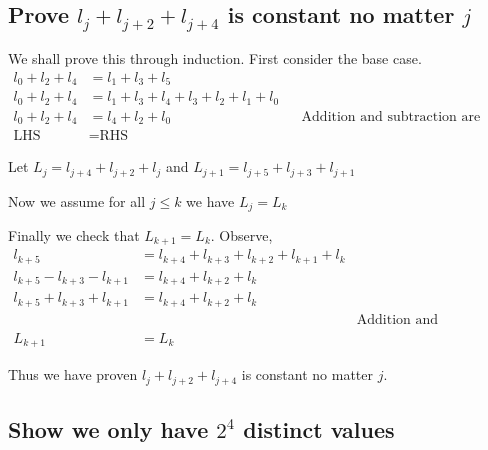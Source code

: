 \documentclass{article}
\begin{document}
\subsection{Prove $l_j+l_{j+2}+l_{j+4}$ is constant no matter $j$}
We shall prove this through induction. First consider the base case.
\begin{align*}
    l_0 + l_2 + l_4 &= l_1 + l_3 + l_5 \\
    l_0 + l_2 + l_4 &= l_1 + l_3 + l_4 + l_3 + l_2 + l_1 + l_0 \\
    l_0 + l_2 + l_4 &= l_4 + l_2 + l_0
    && \text{Addition and subtraction are equal in binary} \\
    \text{LHS} &= \text{RHS}
\end{align*}

Let $L_j = l_{j+4} + l_{j+2} + l_{j}$ and 
$L_{j+1} = l_{j+5} + l_{j+3} + l_{j+1}$

Now we assume for all $j \leq k$ we have $L_j = L_k$

Finally we check that $L_{k+1} = L_k$.
Observe,
\begin{align*}
    l_{k+5} &= l_{k+4} + l_{k+3} + l_{k+2} + l_{k+1} + l_{k} \\
    l_{k+5} - l_{k+3} - l_{k+1} &= l_{k+4} + l_{k+2} + l_{k} \\
    l_{k+5} + l_{k+3} + l_{k+1} &= l_{k+4} + l_{k+2} + l_{k} \\
    && \text{Addition and subtraction are equal in binary} \\
    L_{k+1} &= L_{k}
\end{align*}

Thus we have proven $l_j+l_{j+2}+l_{j+4}$ is constant no matter $j$.

\subsection{Show we only have $2^4$ distinct values}
\end{document}
